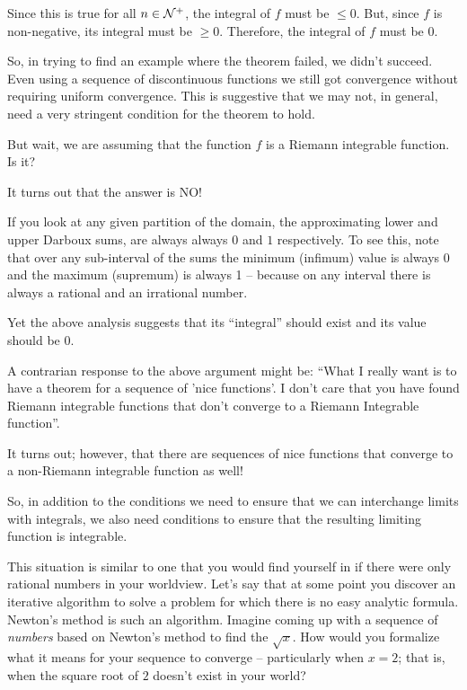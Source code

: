 \documentclass{article}
\begin{document}
Since this is true for all $n \in {\cal N}^+$, the integral of $f$ must be $\le 0$. 
But, since $f$ is non-negative, its integral must be $\ge 0$. Therefore, the 
integral of $f$ must be $0$.

So, in trying to find an example where the theorem failed, we didn't succeed. 
Even using a sequence of discontinuous functions we still got convergence without 
requiring uniform convergence. This is suggestive that we may not, in general, 
need a very stringent condition for the theorem to hold.

But wait, we are assuming that the function $f$ is a Riemann integrable function. 
Is it?

It turns out that the answer is NO! 

If you look at any given partition of the domain, the approximating lower 
and upper Darboux sums, are always 
always $0$ and $1$ respectively. To see this, note that 
over any sub-interval of the sums the minimum (infimum) value is always 0 and 
the maximum (supremum) is always 1 -- because on any interval there is always a 
rational and an irrational number.

Yet the above analysis suggests that its ``integral'' should exist and its value 
should be $0$.

A contrarian response to the above argument might be:
``What I really want is to have a theorem for a sequence of 
'nice functions'. I don't care that you have found Riemann integrable functions that
don't converge to a Riemann Integrable function''. 

It turns out; however, that there are sequences of nice functions that converge 
to a non-Riemann integrable function as well!

So, in addition to the conditions we need to ensure that we can interchange 
limits with integrals, we also need conditions to ensure that the 
resulting limiting function is integrable.

This situation is similar to one that you would find yourself in if there were 
only rational numbers in your worldview. Let's say that at some point 
you discover an iterative 
algorithm to solve a problem for which there is no easy analytic formula. 
Newton's method is such an algorithm. Imagine coming up with a sequence of {\em numbers\/}
based on Newton's method to find the $\sqrt{x}$. How would you formalize what 
it means for your sequence to converge -- particularly when $x = 2$; that is, when the
square root of $2$ doesn't exist in your world?
\end{document}
